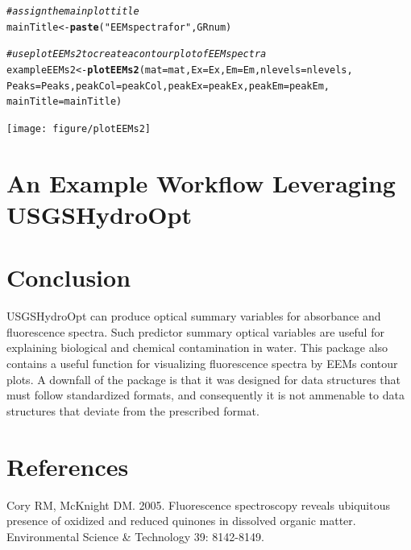 \documentclass[a4paper,11pt]{article}\usepackage[]{graphicx}\usepackage[]{color}
\makeatletter
\newcommand{\hlstr}[1]{\textcolor[rgb]{0.192,0.494,0.8}{#1}}%
\newcommand{\hlcom}[1]{\textcolor[rgb]{0.678,0.584,0.686}{\textit{#1}}}%
\newcommand{\hlstd}[1]{\textcolor[rgb]{0.345,0.345,0.345}{#1}}%
\newcommand{\hlkwb}[1]{\textcolor[rgb]{0.69,0.353,0.396}{#1}}%
\newcommand{\hlkwc}[1]{\textcolor[rgb]{0.333,0.667,0.333}{#1}}%
\newcommand{\hlkwd}[1]{\textcolor[rgb]{0.737,0.353,0.396}{\textbf{#1}}}%
\newenvironment{kframe}{%
 \def\at@end@of@kframe{}%
 \ifinner\ifhmode%
  \def\at@end@of@kframe{\end{minipage}}%
  \begin{minipage}{\columnwidth}%
 \fi\fi%
 \def\FrameCommand##1{\hskip\@totalleftmargin \hskip-\fboxsep
 \colorbox{shadecolor}{##1}\hskip-\fboxsep
     \hskip-\linewidth \hskip-\@totalleftmargin \hskip\columnwidth}%
 \MakeFramed {\advance\hsize-\width
   \@totalleftmargin\z@ \linewidth\hsize
   \@setminipage}}%
 {\par\unskip\endMakeFramed%
 \at@end@of@kframe}
\newenvironment{knitrout}{}{} %
\makeatother
\begin{document}
\begin{knitrout}
\begin{kframe}
\begin{alltt}
\hlcom{# assign the main plot title}
\hlstd{mainTitle} \hlkwb{<-} \hlkwd{paste}\hlstd{(}\hlstr{"EEM spectra for"}\hlstd{, GRnum)}

\hlcom{# use plotEEMs2 to create a contour plot of EEM spectra}
\hlstd{exampleEEMs2} \hlkwb{<-} \hlkwd{plotEEMs2}\hlstd{(}\hlkwc{mat} \hlstd{= mat,} \hlkwc{Ex} \hlstd{= Ex,} \hlkwc{Em} \hlstd{= Em,} \hlkwc{nlevels} \hlstd{= nlevels,}
    \hlkwc{Peaks} \hlstd{= Peaks,} \hlkwc{peakCol} \hlstd{= peakCol,} \hlkwc{peakEx} \hlstd{= peakEx,} \hlkwc{peakEm} \hlstd{= peakEm,}
    \hlkwc{mainTitle} \hlstd{= mainTitle)}
\end{alltt}
\end{kframe}
\texttt{[image: figure/plotEEMs2]} 

\end{knitrout}

\section{An Example Workflow Leveraging USGSHydroOpt}

\section{Conclusion}
USGSHydroOpt can produce optical summary variables for absorbance and fluorescence spectra. Such predictor summary optical variables are useful for explaining biological and chemical contamination in water. This package also contains a useful function for visualizing fluorescence spectra by EEMs contour plots. A downfall of the package is that it was designed for data structures that must follow standardized formats, and consequently it is not ammenable to data structures that deviate from the prescribed format.


\section{References}
Cory RM, McKnight DM. 2005. Fluorescence spectroscopy reveals ubiquitous presence of oxidized and reduced quinones in dissolved organic matter. Environmental Science & Technology 39: 8142-8149.
\end{document}
